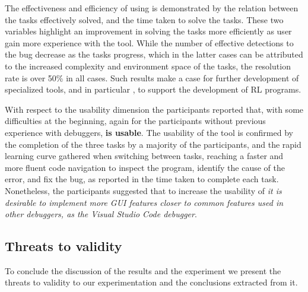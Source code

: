 The effectiveness and efficiency of using \flik is demonstrated by the relation between the tasks 
effectively solved, and the time taken to solve the tasks. These two variables highlight an 
improvement in solving the tasks more efficiently as user gain more experience with the tool. While 
the number of effective detections to the bug decrease as the tasks progress, which in the latter 
cases can be attributed to the increased complexity and environment space of the tasks, the 
resolution rate is over 50\% in all cases. Such results make a case for further development of 
specialized tools, and in particular \flik, to support the development of \ac{RL} programs.
 
With respect to the usability dimension the participants reported that, with some difficulties at the 
beginning, again for the participants without previous experience with debuggers, 
\textbf{\flik is usable}. The usability of the tool is confirmed by the completion of the three tasks by a 
majority of the participants, and the rapid learning curve gathered when switching between tasks, 
reaching a faster and more fluent code navigation to inspect the program, identify the cause of the 
error, and fix the bug, as reported in the time taken to complete each task. Nonetheless, the 
participants suggested that to increase the usability of \flik \textit{it is desirable to implement more GUI 
features closer to common features used in other debuggers, as the Visual Studio Code debugger}.


\subsection{Threats to validity}
\label{sec:threats}

To conclude the discussion of the results and the experiment we present the threats to validity to 
our experimentation and the conclusions extracted from it.

